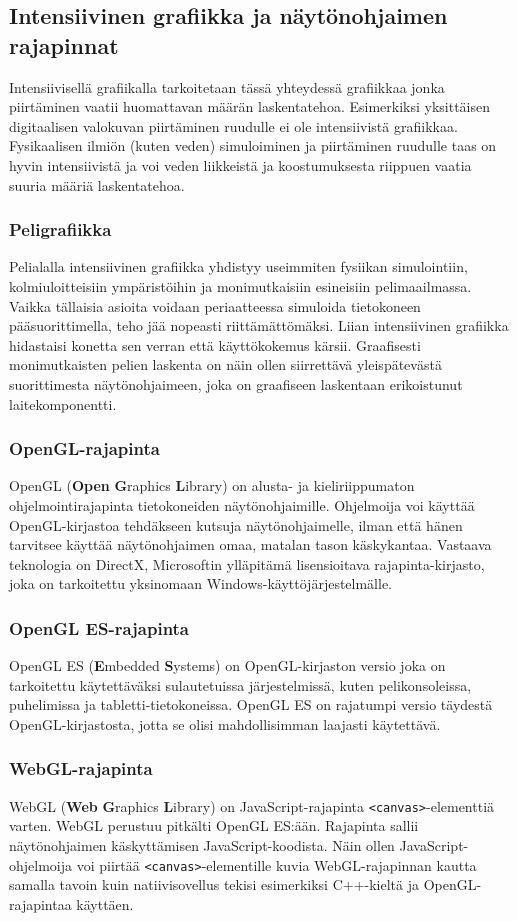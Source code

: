 \subsection{Intensiivinen grafiikka ja näytönohjaimen rajapinnat}
Intensiivisellä grafiikalla tarkoitetaan tässä yhteydessä grafiikkaa jonka piirtäminen vaatii huomattavan määrän laskentatehoa. Esimerkiksi yksittäisen digitaalisen valokuvan piirtäminen ruudulle ei ole intensiivistä grafiikkaa. Fysikaalisen ilmiön (kuten veden) simuloiminen ja piirtäminen ruudulle taas on hyvin intensiivistä ja voi veden liikkeistä ja koostumuksesta riippuen vaatia suuria määriä laskentatehoa.

\subsubsection{Peligrafiikka}
Pelialalla intensiivinen grafiikka yhdistyy useimmiten fysiikan simulointiin, kolmiuloitteisiin ympäristöihin ja monimutkaisiin esineisiin pelimaailmassa. Vaikka tällaisia asioita voidaan periaatteessa simuloida tietokoneen pääsuorittimella, teho jää nopeasti riittämättömäksi. Liian intensiivinen grafiikka hidastaisi konetta sen verran että käyttökokemus kärsii. Graafisesti monimutkaisten pelien laskenta on näin ollen siirrettävä yleispätevästä suorittimesta näytönohjaimeen, joka on graafiseen laskentaan erikoistunut laitekomponentti. 

\subsubsection{OpenGL-rajapinta}
OpenGL (\textbf{Open} \textbf{G}raphics \textbf{L}ibrary) on alusta- ja kieliriippumaton ohjelmointirajapinta tietokoneiden näytönohjaimille\cite{opengl4}. Ohjelmoija voi käyttää OpenGL-kirjastoa tehdäkseen kutsuja näytönohjaimelle, ilman että hänen tarvitsee käyttää näytönohjaimen omaa, matalan tason käskykantaa. Vastaava teknologia on DirectX\cite{directx}, Microsoftin ylläpitämä lisensioitava rajapinta-kirjasto, joka on tarkoitettu yksinomaan Windows-käyttöjärjestelmälle.

\subsubsection{OpenGL ES-rajapinta}
OpenGL ES (\textbf{E}mbedded \textbf{S}ystems) on OpenGL-kirjaston versio joka on tarkoitettu käytettäväksi sulautetuissa järjestelmissä, kuten pelikonsoleissa, puhelimissa ja tabletti-tietokoneissa. OpenGL ES on rajatumpi versio täydestä OpenGL-kirjastosta, jotta se olisi mahdollisimman laajasti käytettävä.\cite{opengles} 

\subsubsection{WebGL-rajapinta}
WebGL (\textbf{Web} \textbf{G}raphics \textbf{L}ibrary) on JavaScript-rajapinta \texttt{<canvas>}-elementtiä varten. WebGL perustuu pitkälti OpenGL ES:ään\cite{webgl_specification}. Rajapinta sallii näytönohjaimen käskyttämisen JavaScript-koodista. Näin ollen JavaScript-ohjelmoija voi piirtää \texttt{<canvas>}-elementille kuvia WebGL-rajapinnan kautta samalla tavoin kuin natiivisovellus tekisi esimerkiksi C++-kieltä ja OpenGL-rajapintaa käyttäen.
